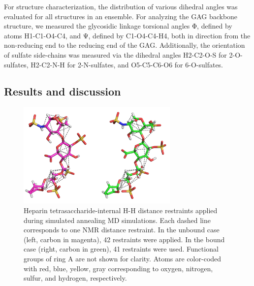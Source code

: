 For structure characterization, the distribution of various dihedral angles was
evaluated for all structures in an ensemble. For analyzing the GAG backbone
structure, we measured the glycosidic linkage torsional angles Φ, defined by
atoms H1-C1-O4-C4, and Ψ, defined by C1-O4-C4-H4, both in direction from the
non-reducing end to the reducing end of the GAG. Additionally, the orientation
of sulfate side-chains was measured via the dihedral angles H2-C2-O-S for
2-O-sulfates, H2-C2-N-H for 2-N-sulfates, and O5-C5-C6-O6 for 6-O-sulfates.

\subsection{Results and discussion}

\begin{figure}
\centering
\includegraphics[width=0.7\textwidth]{gfx/nmr/two_cases_dashed_lines_distances.png}
\caption[]{
Heparin tetrasaccharide-internal H-H distance restraints applied during
simulated annealing MD simulations. Each dashed line corresponds to one NMR
distance restraint. In the unbound case (left, carbon in magenta), 42
restraints were applied. In the bound case (right, carbon in green), 41
restraints were used. Functional groups of ring A are not shown for clarity.
Atoms are color-coded with red, blue, yellow, gray corresponding to oxygen,
nitrogen, sulfur, and hydrogen, respectively.
}
\label{fig:nmr:hp_dashed_lines_distances}
\end{figure}

